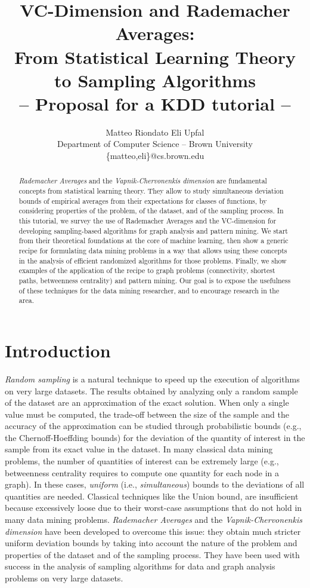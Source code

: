 \documentclass[11pt]{article}
\title{VC-Dimension and Rademacher Averages:\\From Statistical Learning Theory to
	Sampling Algorithms \\ {\large -- Proposal for a KDD tutorial -- }}
\author{Matteo Riondato \qquad Eli Upfal \\ Department of Computer
	Science -- Brown University \\
	\textsf{\{matteo,eli\}@cs.brown.edu}}
\date{}
\begin{document}
\maketitle

\begin{abstract}
	\emph{Rademacher Averages} and the \emph{Vapnik-Chervonenkis dimension} are fundamental
concepts from statistical learning theory. They allow to study simultaneous deviation bounds
of empirical averages from their expectations for classes of functions, by
considering properties of the problem, of the dataset, and of the
sampling process. In this tutorial, we survey the use of Rademacher Averages and
the VC-dimension for developing sampling-based algorithms for graph analysis and
pattern mining. We start from their theoretical foundations at the core of
machine learning, then show a generic recipe for formulating data mining
problems in a way that allows using these concepts in the analysis of efficient
randomized algorithms for those problems. Finally, we show examples of the
application of the recipe to graph problems (connectivity, shortest paths,
betweenness centrality) and pattern mining. Our goal is to expose the usefulness
of these techniques for the data mining researcher, and to encourage research in
the area.
\end{abstract}

\section*{Introduction}
\emph{Random sampling} is a natural technique to speed up the execution of
algorithms on very large datasets. The results obtained by analyzing only a
random sample of the dataset are an approximation of the exact solution.  When
only a single value must be computed, the trade-off between the size of the
sample and the accuracy of the approximation can be studied through
probabilistic bounds (e.g., the Chernoff-Hoeffding bounds) for the deviation of
the quantity of interest in the sample from its exact value in the dataset. In
many classical data mining problems, the number of quantities of interest can be
extremely large (e.g., betweenness centrality requires to compute one quantity
for each node in a graph). In these cases, \emph{uniform} (i.e.,
\emph{simultaneous}) bounds to the deviations of all quantities are needed.
Classical techniques like the Union bound, are insufficient because excessively
loose due to their worst-case assumptions that do not hold in many data mining
problems. \emph{Rademacher Averages} and the \emph{Vapnik-Chervonenkis dimension} have
been developed to overcome this issue: they obtain much stricter uniform
deviation bounds by taking into account the nature of the problem and properties
of the dataset and of the sampling process. They have been used with success in
the analysis of sampling algorithms for data and graph analysis problems on very
large datasets.
\end{document}
